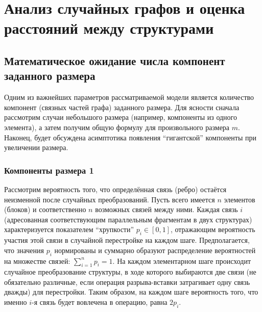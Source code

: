 \chapter{Анализ случайных графов и оценка расстояний между структурами}
\label{chap:random_graphs}

\section{Математическое ожидание числа компонент заданного размера}

Одним из важнейших параметров рассматриваемой модели является количество компонент (связных частей графа) заданного размера. Для ясности сначала рассмотрим случаи небольшого размера (например, компоненты из одного элемента), а затем получим общую формулу для произвольного размера $m$. Наконец, будет обсуждена асимптотика появления ``гигантской'' компоненты при увеличении размера.

\subsection{Компоненты размера 1}

Рассмотрим вероятность того, что определённая связь (ребро) остаётся неизменной после случайных преобразований. Пусть всего имеется $n$ элементов (блоков) и соответственно $n$ возможных связей между ними. Каждая связь $i$ (адресованная соответствующим параллельным фрагментам в двух структурах) характеризуется показателем ``хрупкости'' $p_i \in [0,1]$, отражающим вероятность участия этой связи в случайной перестройке на каждом шаге. Предполагается, что значения $p_i$ нормированы и суммарно образуют распределение вероятностей на множестве связей: $\sum_{i=1}^n p_i = 1$. На каждом элементарном шаге происходит случайное преобразование структуры, в ходе которого выбираются две связи (не обязательно различные, если операция разрыва-вставки затрагивает одну связь дважды) для перестройки. Таким образом, на каждом шаге вероятность того, что именно $i$-я связь будет вовлечена в операцию, равна $2 p_i$. 

